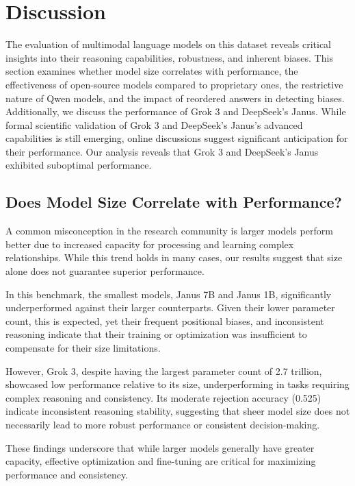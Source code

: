 \section{Discussion}\label{sec:discussion}

The evaluation of multimodal language models on this dataset reveals critical insights into their reasoning capabilities, robustness, and inherent biases. This section examines whether model size correlates with performance, the effectiveness of open-source models compared to proprietary ones, the restrictive nature of Qwen models, and the impact of reordered answers in detecting biases. Additionally, we discuss the performance of Grok 3 and DeepSeek's Janus. While formal scientific validation of Grok 3 and DeepSeek's Janus's advanced capabilities is still emerging, online discussions suggest significant anticipation for their performance. Our analysis reveals that Grok 3 and DeepSeek's Janus exhibited suboptimal performance.

\subsection{Does Model Size Correlate with Performance?}

A common misconception in the research community is larger models perform better due to increased capacity for processing and learning complex relationships. While this trend holds in many cases, our results suggest that size alone does not guarantee superior performance.

In this benchmark, the smallest models, Janus 7B and Janus 1B, significantly underperformed against their larger counterparts. Given their lower parameter count, this is expected, yet their frequent positional biases, and inconsistent reasoning indicate that their training or optimization was insufficient to compensate for their size limitations.

However, Grok 3, despite having the largest parameter count of 2.7 trillion, showcased low performance relative to its size, underperforming in tasks requiring complex reasoning and consistency. Its moderate rejection accuracy (0.525) indicate inconsistent reasoning stability, suggesting that sheer model size does not necessarily lead to more robust performance or consistent decision-making.

These findings underscore that while larger models generally have greater capacity, effective optimization and fine-tuning are critical for maximizing performance and consistency.



